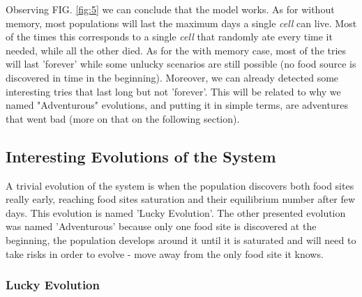 \documentclass[a4paper,prd,twocolumn,nofootinbib,superscriptaddress,floatfix]{revtex4}
\begin{document}
Observing FIG. \ref{fig:5} we can conclude that the model works. As for without memory, most populations will last the maximum days a single \textit{cell} can live. Most of the times this corresponds to a single \textit{cell} that randomly ate every time it needed, while all the other died. As for the with memory case, most of the tries will last 'forever' while some unlucky scenarios are still possible (no food source is discovered in time in the beginning). Moreover, we can already detected some interesting tries that last long but not 'forever'. This will be related to why we named "Adventurous" evolutions, and putting it in simple terms, are adventures that went bad (more on that on the following section).


\subsection{Interesting Evolutions of the System}

A trivial evolution of the system is when the population discovers both food sites really early, reaching food sites saturation and their equilibrium number after few days. This evolution is named 'Lucky Evolution'.
The other presented evolution  was named 'Adventurous' because only one food site is discovered at the beginning, the population develops around it until it is saturated and will need to take risks in order to evolve - move away from the only food site it knows. \\

\subsubsection{Lucky Evolution}
\end{document}
